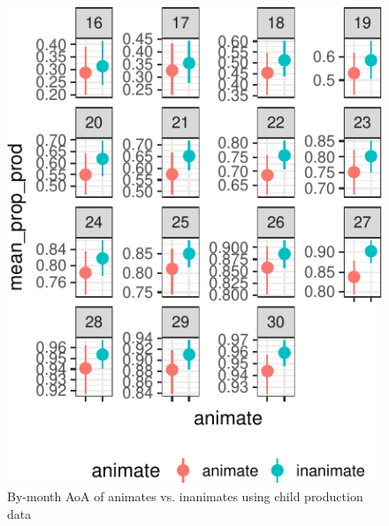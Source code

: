 \documentclass[10pt, letterpaper]{article}
\newenvironment{CodeChunk}{}{}
\begin{document}
\begin{CodeChunk}
\begin{figure}[tb]
\includegraphics{figs/animacy-aoa-prod-1} \caption[By-month AoA of animates vs]{By-month AoA of animates vs. inanimates using child production data}\label{fig:animacy-aoa-prod}
\end{figure}
\end{CodeChunk}
\end{document}
